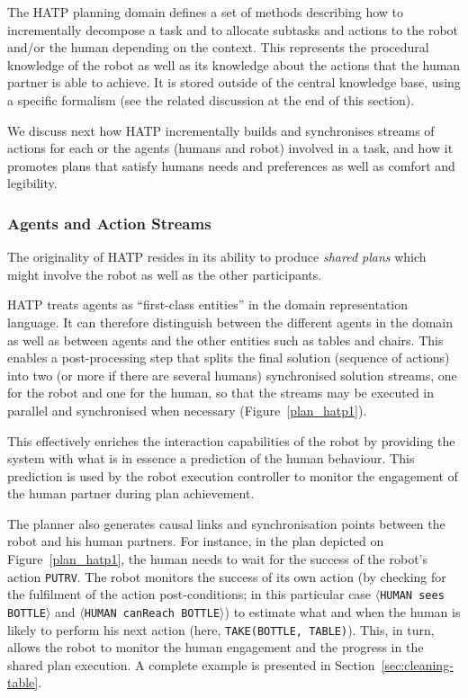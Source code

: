 \documentclass[preprint,3p,times]{elsarticle}
\newcommand{\concept}[1]{{\small \texttt{#1}}}
\newcommand{\stmt}[1]{{\footnotesize\tt$\langle$#1\relax$\rangle$}}
\begin{document}
The HATP planning domain defines a set of methods describing how to
incrementally decompose a task and to allocate subtasks and actions to the robot and/or the human depending on the context. This represents the procedural knowledge of the robot as well as
its knowledge about the actions that the human partner is able to achieve. It is
stored outside of the central knowledge base, using a specific formalism (see
the related discussion at the end of this section).

We discuss next how HATP incrementally builds and synchronises streams of
actions for each or the agents (humans and robot) involved in a task, and how it
promotes plans that satisfy humans needs and preferences as well as comfort and
legibility.

\subsubsection{Agents and Action Streams}

The originality of HATP resides in its ability to produce \emph{shared plans} which might involve 
the robot as well as the other participants.

HATP treats agents as ``first-class
entities'' in the domain representation language. It can therefore
distinguish between the different agents in the domain as well as
between agents and the other entities such as tables and chairs. This
enables a post-processing step that splits the final
solution (sequence of actions) into two (or more if there are several
humans) synchronised solution
streams, one for the robot and one for the human, so that the streams may be executed in
parallel and synchronised when necessary (Figure~\ref{plan_hatp1}).

This effectively enriches the interaction capabilities of the robot by providing
the system with what is in essence a prediction of the human behaviour. This
prediction is used by the robot execution controller to monitor the engagement
of the human partner during plan achievement.

The planner also generates causal links and synchronisation points between the robot and his human partners. For
instance, in the plan depicted on Figure~\ref{plan_hatp1}, the human needs to
wait for the success of the robot's action {\tt PUTRV}. The robot monitors the
success of its own action (by checking for the fulfilment of the action
post-conditions; in this particular case \stmt{HUMAN sees BOTTLE} and
\stmt{HUMAN canReach BOTTLE}) to estimate what and when the human is likely to
perform his next action (here, \concept{TAKE(BOTTLE, TABLE)}). This, in turn,
allows the robot to monitor the human engagement and the progress in the shared
plan execution. A complete example is presented in
Section~\ref{sec:cleaning-table}.
\end{document}
